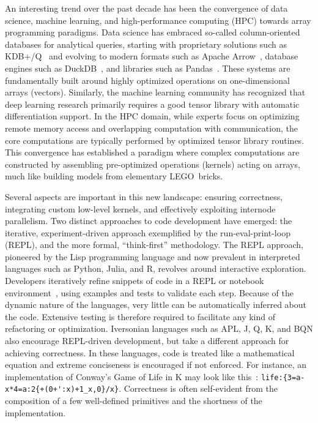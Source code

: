 An interesting trend over the past decade has been the convergence of data science, machine learning, and high-performance computing (HPC) towards array programming paradigms. Data science has embraced so-called column-oriented databases for analytical queries, starting with proprietary solutions such as KDB+/Q~ and evolving to modern formats such as Apache Arrow~, database engines such as DuckDB~, and libraries such as Pandas~\cite{reback2020pandas,McKinn_2010_Data_Structures}. These systems are fundamentally built around highly optimized operations on one-dimensional arrays (vectors). Similarly, the machine learning community has recognized that deep learning research primarily requires a good tensor library with automatic differentiation support. In the HPC domain, while experts focus on optimizing remote memory access and overlapping computation with communication, the core computations are typically performed by optimized tensor library routines. This convergence has established a paradigm where complex computations are constructed by assembling pre-optimized operations (kernels) acting on arrays, much like building models from elementary LEGO\textregistered\   bricks.

Several aspects are important in this new landscape: ensuring correctness, integrating custom low-level kernels, and effectively exploiting internode parallelism. Two distinct approaches to code development have emerged: the iterative, experiment-driven approach exemplified by the run-eval-print-loop (REPL), and the more formal, ``think-first'' methodology. The REPL approach, pioneered by the Lisp programming language and now prevalent in interpreted languages such as Python, Julia, and R, revolves around interactive exploration. Developers iteratively refine snippets of code in a REPL or notebook environment~, using examples and tests to validate each step. Because of the dynamic nature of the languages, very little can be automatically inferred about the code. Extensive testing is therefore required to facilitate any kind of refactoring or optimization. Iversonian languages such as APL, J, Q, K, and BQN also encourage REPL-driven development, but take a different approach for achieving correctness. In these languages, code is treated like a mathematical equation and extreme conciseness is encouraged if not enforced. For instance, an implementation of Conway's Game of Life in K may look like this~: \verb|life:{3=a-x*4=a:2{+(0+':x)+1_x,0}/x}|. Correctness is often self-evident from the composition of a few well-defined primitives and the shortness of the implementation.

